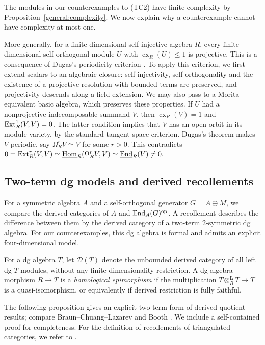 \documentclass[11pt]{article}
\begin{document}
\begin{Rem}\label{general:bounded-selforthogonal}
The modules in our counterexamples to (TC2) have finite complexity
by Proposition~\ref{general:complexity}. We now explain why a
counterexample cannot have complexity at most one.

More generally, for a finite-dimensional self-injective algebra $R$, every
finite-dimensional self-orthogonal module $U$ with
$\operatorname{cx}_R(U)\le1$ is projective. This is a consequence
of Dugas's periodicity criterion \cite[Theorem~1]{Dugas}.
To apply this criterion, we first extend scalars to an algebraic closure:
self-injectivity,
self-orthogonality and the existence of a projective resolution with
bounded terms are preserved, and projectivity descends along a field
extension. We may also pass to a Morita equivalent basic algebra,
which preserves these properties.
If $U$ had a nonprojective indecomposable summand $V$, then
$\operatorname{cx}_R(V)=1$ and ${\rm Ext}_R^1(V,V)=0$.
The latter condition implies that $V$ has an open orbit in its module
variety, by the standard tangent-space criterion.
Dugas's theorem makes $V$ periodic, say $\Omega_R^rV\simeq V$
for some $r>0$. This contradicts
$0={\rm Ext}_R^r(V,V)\simeq\underline{{\rm Hom}}_R(\Omega_R^rV,V)
\simeq\underline{{\rm End}}_R(V)\ne0.$
\end{Rem}

\subsection{Two-term dg models and derived recollements}
\label{general:dg-models}

For a symmetric algebra $A$ and a self-orthogonal generator
$G=A\oplus M$, we compare the derived categories of $A$ and
${\rm End}_A(G)^{\mathrm{op}}$. A recollement describes the difference
between them by the derived category of a two-term $2$-symmetric dg
algebra. For our counterexamples, this dg algebra is formal and
admits an explicit four-dimensional model.

For a dg algebra $T$, let $\mathscr D(T)$ denote the unbounded
derived category of all left dg $T$-modules, without any
finite-dimensionality restriction. A dg algebra morphism
$R\to T$ is a \emph{homological epimorphism} if the multiplication
$T\otimes_R^{\mathbf L}T\to T$ is a quasi-isomorphism, or equivalently
if derived restriction is fully faithful.

The following proposition gives an explicit two-term form of
derived quotient results; compare Braun--Chuang--Lazarev
\cite[Remark~9.5]{BCL} and Booth \cite[Corollary~3.2.4]{BoothDQ}.
We include a self-contained proof for completeness.
For the definition of recollements of triangulated categories,
we refer to \cite[Section~1.4.3]{BBD}.
\end{document}
